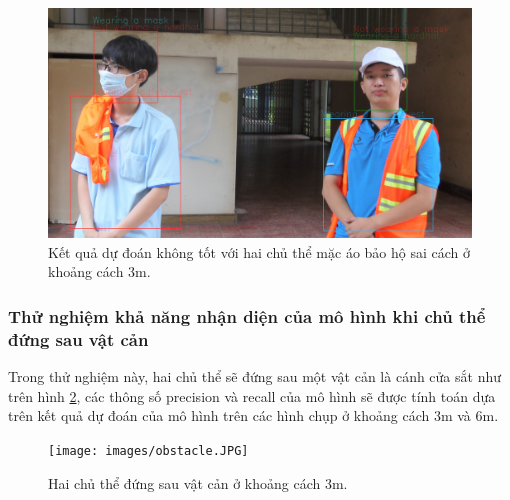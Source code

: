 \begin{figure}[ht!]
	\centerline{\includegraphics[scale=0.18]{images/bad_sv_predict_4.jpg}}
  	\caption{Kết quả dự đoán không tốt với hai chủ thể mặc áo bảo hộ sai cách ở khoảng cách 3m.}
  	\label{fig:bad_sv_pred_3}
\end{figure}

\subsubsection{Thử nghiệm khả năng nhận diện của mô hình khi chủ thể đứng sau vật cản}
Trong thử nghiệm này, hai chủ thể sẽ đứng sau một vật cản là cánh cửa sắt như trên hình \ref{fig:obstacle}, các thông số precision và recall của mô hình sẽ được tính toán dựa trên kết quả dự đoán của mô hình trên các hình chụp ở khoảng cách $3$m và $6$m.
\begin{figure}[ht!]
	\centerline{\texttt{[image: images/obstacle.JPG]}}
  	\caption{Hai chủ thể đứng sau vật cản ở khoảng cách 3m.}
  	\label{fig:obstacle}
\end{figure}

